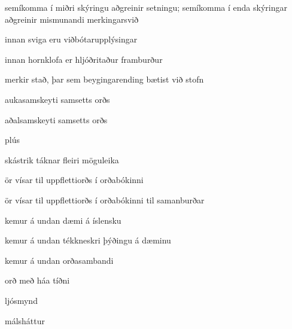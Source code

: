 \item[{;}] {semíkomma í miðri skýringu aðgreinir setningu; semíkomma í enda skýringar aðgreinir mismunandi merkingarsvið}

\item[{(...)}] {innan sviga eru viðbótarupplýsingar}
\item[{[...]}] {innan hornklofa er hljóðritaður framburður}
\item[{|}] {merkir stað, þar sem beygingarending bætist við stofn}
\item[{·}] {aukasamskeyti samsetts orðs}
\item[{··}] {aðalsamskeyti samsetts orðs}
\item[{+}] {plús}
\item[{/}] {skástrik táknar fleiri möguleika}
\item[{\dicsymSee}] {ör vísar til uppflettiorðs í orðabókinni}
\item[{\dicsymCompare}] {ör vísar til uppflettiorðs í orðabókinni til samanburðar}
\item[{\dicsymExampleIS}] {kemur á undan dæmi á íslensku}
\item[{\dicsymExampleCS}] {kemur á undan tékkneskri þýðingu á dæminu}
\item[{\dicsymIdiom}] {kemur á undan orðasambandi}
\item[{\dicsymFrequent}] {orð með háa tíðni}

\item[{\dicsymPhoto}] {ljósmynd}
\item[{\dicsymProverb}] {málsháttur}
